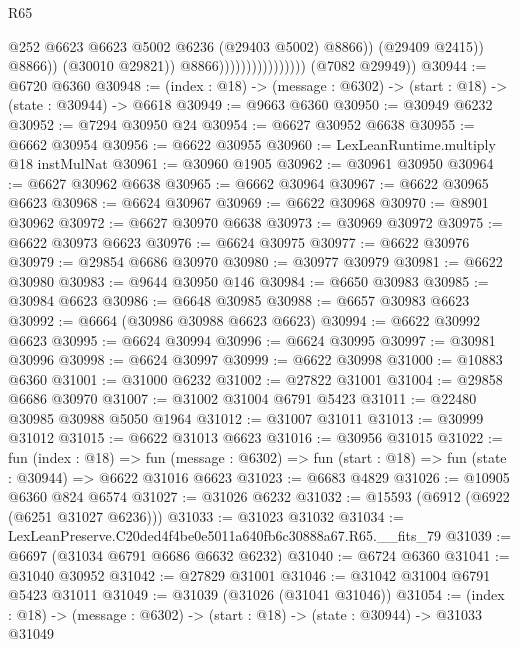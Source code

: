 \begin{lexlean}{R65}
\begin{coremodule}
{                                                  @252
                                                  @6623
                                                  @6623
                                                  @5002
                                                  @6236
                                                  (@29403 @5002)
                                                  @8866))
                                              (@29409 @2415))
                                            @8866))
                                        (@30010 @29821))
                                      @8866))))))))))))))))
      (@7082 @29949))
@30944 := @6720 @6360
@30948 := (index : @18) -> (message : @6302) -> (start : @18) -> (state : @30944) -> @6618
@30949 := @9663 @6360
@30950 := @30949 @6232
@30952 := @7294 @30950 @24
@30954 := @6627 @30952 @6638
@30955 := @6662 @30954
@30956 := @6622 @30955
@30960 := LexLeanRuntime.multiply @18 instMulNat
@30961 := @30960 @1905
@30962 := @30961 @30950
@30964 := @6627 @30962 @6638
@30965 := @6662 @30964
@30967 := @6622 @30965 @6623
@30968 := @6624 @30967
@30969 := @6622 @30968
@30970 := @8901 @30962
@30972 := @6627 @30970 @6638
@30973 := @30969 @30972
@30975 := @6622 @30973 @6623
@30976 := @6624 @30975
@30977 := @6622 @30976
@30979 := @29854 @6686 @30970
@30980 := @30977 @30979
@30981 := @6622 @30980
@30983 := @9644 @30950 @146
@30984 := @6650 @30983
@30985 := @30984 @6623
@30986 := @6648 @30985
@30988 := @6657 @30983 @6623
@30992 := @6664 (@30986 @30988 @6623 @6623)
@30994 := @6622 @30992 @6623
@30995 := @6624 @30994
@30996 := @6624 @30995
@30997 := @30981 @30996
@30998 := @6624 @30997
@30999 := @6622 @30998
@31000 := @10883 @6360
@31001 := @31000 @6232
@31002 := @27822 @31001
@31004 := @29858 @6686 @30970
@31007 := @31002 @31004 @6791 @5423
@31011 := @22480 @30985 @30988 @5050 @1964
@31012 := @31007 @31011
@31013 := @30999 @31012
@31015 := @6622 @31013 @6623
@31016 := @30956 @31015
@31022 := fun (index : @18) =>
  fun (message : @6302) => fun (start : @18) => fun (state : @30944) => @6622 @31016 @6623
@31023 := @6683 @4829
@31026 := @10905 @6360 @824 @6574
@31027 := @31026 @6232
@31032 := @15593 (@6912 (@6922 (@6251 @31027 @6236)))
@31033 := @31023 @31032
@31034 := LexLeanPreserve.C20ded4f4be0e5011a640fb6c30888a67.R65.__fits_79
@31039 := @6697 (@31034 @6791 @6686 @6632 @6232)
@31040 := @6724 @6360
@31041 := @31040 @30952
@31042 := @27829 @31001
@31046 := @31042 @31004 @6791 @5423 @31011
@31049 := @31039 (@31026 (@31041 @31046))
@31054 := (index : @18) -> (message : @6302) -> (start : @18) -> (state : @30944) -> @31033 @31049
}
\end{coremodule}
\end{lexlean}

